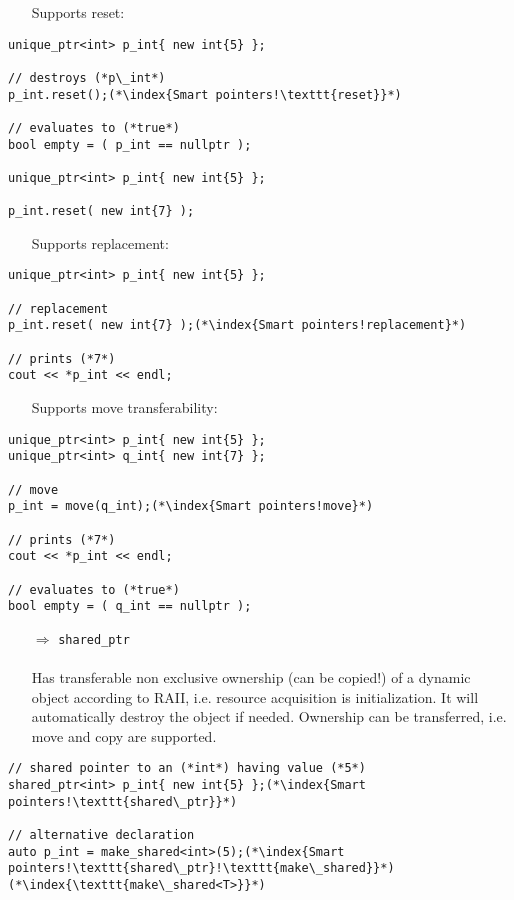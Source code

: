 \documentclass[10pt]{book}
\begin{document}
\begin{enumerate}
\item[] Supports reset:
\end{enumerate}
\begin{lstlisting}
unique_ptr<int> p_int{ new int{5} };

// destroys (*p\_int*)    
p_int.reset();(*\index{Smart pointers!\texttt{reset}}*)

// evaluates to (*true*)
bool empty = ( p_int == nullptr );

unique_ptr<int> p_int{ new int{5} };

p_int.reset( new int{7} );
\end{lstlisting}
\begin{enumerate}
\item[] Supports replacement:
\end{enumerate}
\begin{lstlisting}
unique_ptr<int> p_int{ new int{5} };

// replacement
p_int.reset( new int{7} );(*\index{Smart pointers!replacement}*)

// prints (*7*)
cout << *p_int << endl;
\end{lstlisting}
\begin{enumerate}
\item[] Supports move transferability:
\end{enumerate}
\begin{lstlisting}
unique_ptr<int> p_int{ new int{5} };
unique_ptr<int> q_int{ new int{7} };

// move
p_int = move(q_int);(*\index{Smart pointers!move}*)

// prints (*7*)
cout << *p_int << endl;

// evaluates to (*true*)
bool empty = ( q_int == nullptr );
\end{lstlisting}
\begin{enumerate}
\item[$\Rightarrow$] \texttt{shared\_ptr}\\ \\
Has transferable non exclusive ownership (can be copied!) of a dynamic object according to RAII, i.e. resource acquisition is initialization. It will 
automatically destroy the object if needed. Ownership can be transferred, i.e. move and copy are supported. 
\end{enumerate}
\begin{lstlisting}
// shared pointer to an (*int*) having value (*5*)
shared_ptr<int> p_int{ new int{5} };(*\index{Smart pointers!\texttt{shared\_ptr}}*)

// alternative declaration
auto p_int = make_shared<int>(5);(*\index{Smart pointers!\texttt{shared\_ptr}!\texttt{make\_shared}}*)(*\index{\texttt{make\_shared<T>}}*)
\end{lstlisting}
\end{document}
